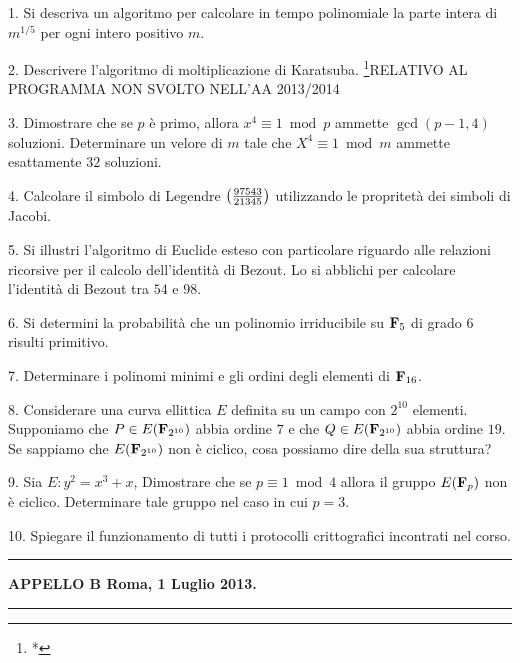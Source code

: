 \item{1.} Si descriva un algoritmo per calcolare in tempo polinomiale la parte intera di $m^{1/5}$ per ogni intero positivo $m$.
\item{2.} Descrivere l'algoritmo di moltiplicazione di Karatsuba. \footnote{*}{RELATIVO AL PROGRAMMA NON SVOLTO NELL'AA 2013/2014}
\item{3.} Dimostrare che se $p$ \`e primo, allora $x^4\equiv1\bmod p$ ammette $\gcd(p-1,4)$ soluzioni.
Determinare un velore di $m$ tale che $X^4\equiv 1\bmod m$ ammette esattamente $32$ soluzioni. 
\item{4.} Calcolare il simbolo di Legendre $\left({97543\over 21345}\right)$ utilizzando le propritet\`a dei simboli di Jacobi.  
\item{5.} Si illustri l'algoritmo di Euclide esteso con particolare riguardo alle relazioni ricorsive per il calcolo dell'identit\`a di
Bezout. Lo si abblichi per calcolare l'identit\`a di Bezout tra $54$ e $98$.
\item{6.} Si determini la probabilit\`a che un polinomio irriducibile su ${\bf F}_5$ di grado $6$ risulti primitivo.
\item{7.} Determinare i polinomi minimi e gli ordini degli elementi di ${\bf F}_{16}$.
\item{8.} Considerare una curva ellittica $E$ definita su un campo con $2^{10}$ elementi. Supponiamo che $P\in E({\bf F}_{2^{10}})$
abbia ordine $7$ e che $Q\in E({\bf F}_{2^{10}})$ abbia ordine $19$. Se sappiamo che $E({\bf F}_{2^{10}})$ non \`e ciclico, cosa possiamo
dire della sua struttura?
\item{9.} Sia $E: y^2=x^3+x$,  Dimostrare che se $p\equiv1\bmod4$ allora il gruppo $E({\bf F}_p)$ non \`e ciclico.
Determinare tale gruppo nel caso in cui $p=3$.
\item{10.} Spiegare il funzionamento di tutti i protocolli crittografici incontrati nel corso.
\bigskip\vfill\eject


\bigskip\hrule\bigskip
\centerline{{\bf APPELLO B \hfill Roma, 1 Luglio 2013.}} \bigskip\hrule\bigskip

